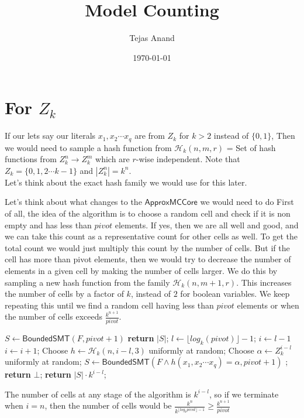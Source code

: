 \documentclass{article}
\author{Tejas Anand}
\title{Model Counting}
\date{\today}
\begin{document}
\maketitle

\section{For $Z_k$}
If our lets say our literals $x_1, x_2 \cdots x_q$ are from $Z_k$ for $k > 2$ instead of $\{0,1\}$, 
Then we would need to sample a hash function from $\mathcal{H}_k(n,m,r)$ = Set of hash functions from $Z_k^{n} \rightarrow Z_k^{m}$ which are  $r$-wise independent.
Note that $Z_k = \{0,1,2\cdots k-1\}$ and $|Z_k^{n}| = k^n$.\\ 
Let's think about the exact hash family we would use for this later.

Let's think about what changes to the $\mathsf{ApproxMCCore}$ we would need to do
First of all, the idea of the algorithm is to choose a random cell and check if it is non empty and has less than $pivot$ elements. If yes, then we are all well and good, and we can take this count as a representative count for other cells as well. 
To get the total count we would just multiply this count by the number of cells. 
But if the cell has more than pivot elements, then we would try to decrease the number of elements in a given cell by making the number of cells larger. We do this by sampling a new hash function from the family $\mathcal{H}_k(n,m + 1,r)$. This increases the number of cells by a factor of $k$, instead of $2$ for boolean variables.
We keep repeating this until we find a random cell having less than $pivot$ elements or when the number of cells exceeds $\frac{k^{n+1}}{pivot}$. 

\begin{algorithm}
	\caption{$\mathsf{ApproxMCCore}(F,pivot)$}
\begin{algorithmic}[1]
	\State $S \gets \mathsf{BoundedSMT}(F, pivot + 1)$
		\State \textbf{return} $|S|$;
	\Else
		\State $l \gets \lfloor log_{k}(pivot) \rfloor - 1$; $i \gets l - 1$
		\Repeat
		\State $i \gets i + 1$;
		\State Choose $h \gets \mathcal{H}_k(n, i - l , 3)$ uniformly at random;
		\State Choose $\alpha \gets Z_k^{i - l}$ uniformly at random;
		\State $S \gets \mathsf{BoundedSMT}(F \wedge h(x_1,x_2\cdots x_q) = \alpha, pivot + 1)$
		;
	\EndIf
		\State \textbf{return} $\bot$;
	\Else 
		\State \textbf{return} $|S|\cdot k ^{i - l}$;
	\EndIf

    \end{algorithmic}
\end{algorithm}
The number of cells at any stage of the algorithm is $k^{i - l}$, so if we terminate when $i = n$, then the number of cells would be $\frac{k^{n}}{k ^{\lfloor log_{k}{pivot} \rfloor - 1}} \geq \frac{k^{n+1}}{pivot}$
\end{document}
